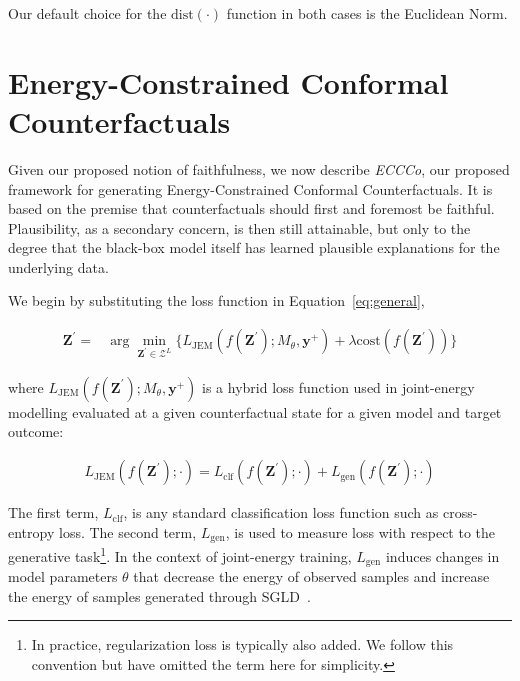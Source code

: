 Our default choice for the $\text{dist}(\cdot)$ function in both cases is the Euclidean Norm.

\section{Energy-Constrained Conformal Counterfactuals}\label{meth}

Given our proposed notion of faithfulness, we now describe \textit{ECCCo}, our proposed framework for generating Energy-Constrained Conformal Counterfactuals. It is based on the premise that counterfactuals should first and foremost be faithful. Plausibility, as a secondary concern, is then still attainable, but only to the degree that the black-box model itself has learned plausible explanations for the underlying data. 

We begin by substituting the loss function in Equation~\ref{eq:general},

\begin{equation} \label{eq:eccco-start}
  \begin{aligned}
  \mathbf{Z}^\prime =& \arg \min_{\mathbf{Z}^\prime \in \mathcal{Z}^L} \{  {L_{\text{JEM}}(f(\mathbf{Z}^\prime);M_{\theta},\mathbf{y}^+)}+ \lambda {\text{cost}(f(\mathbf{Z}^\prime)) } \} 
  \end{aligned} 
\end{equation}

where $L_{\text{JEM}}(f(\mathbf{Z}^\prime);M_{\theta},\mathbf{y}^+)$ is a hybrid loss function used in joint-energy modelling evaluated at a given counterfactual state for a given model and target outcome:

\begin{equation}
  \begin{aligned}
    L_{\text{JEM}}(f(\mathbf{Z}^\prime); \cdot) = L_{\text{clf}}(f(\mathbf{Z}^\prime); \cdot) + L_{\text{gen}}(f(\mathbf{Z}^\prime); \cdot)
  \end{aligned}
\end{equation}

The first term, $L_{\text{clf}}$, is any standard classification loss function such as cross-entropy loss. The second term, $L_{\text{gen}}$, is used to measure loss with respect to the generative task\footnote{In practice, regularization loss is typically also added. We follow this convention but have omitted the term here for simplicity.}. In the context of joint-energy training, $L_{\text{gen}}$ induces changes in model parameters $\theta$ that decrease the energy of observed samples and increase the energy of samples generated through SGLD~\citep{du2019implicit}. 

